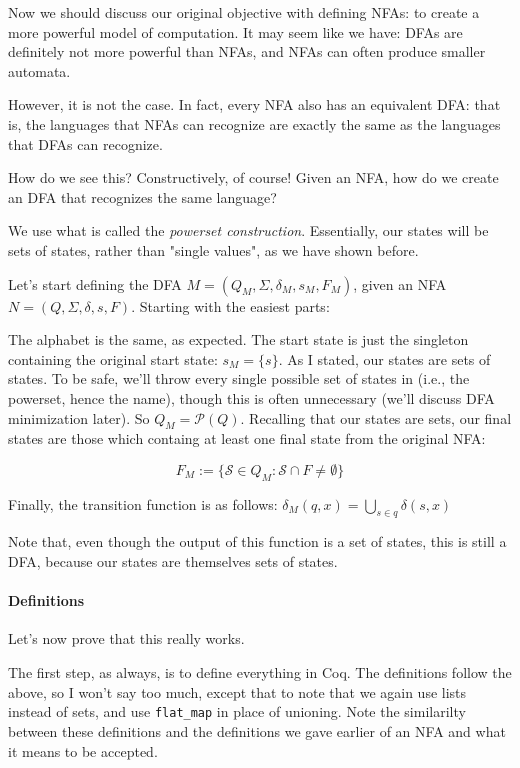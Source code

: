 Now we should discuss our original objective with defining NFAs: to create a more powerful model of computation.
It may seem like we have: DFAs are definitely not more powerful than NFAs, and NFAs can often produce smaller automata.

However, it is not the case.
In fact, every NFA also has an equivalent DFA: that is, the languages that NFAs can recognize are exactly the same as the languages that DFAs can recognize.

How do we see this?
Constructively, of course!
Given an NFA, how do we create an DFA that recognizes the same language?

We use what is called the \textit{powerset construction}.
Essentially, our states will be sets of states, rather than "single values", as we have shown before.

Let's start defining the DFA $M = (Q_M, \Sigma, \delta_M, s_M, F_M)$, given an NFA $N = (Q, \Sigma, \delta, s, F)$.
Starting with the easiest parts:

The alphabet is the same, as expected.
The start state is just the singleton containing the original start state: $s_M = \{s\}$.
As I stated, our states are sets of states.
To be safe, we'll throw every single possible set of states in (i.e., the powerset, hence the name), though this is often unnecessary (we'll discuss DFA minimization later).
So $Q_M = \mathcal{P}(Q)$.
Recalling that our states are sets, our final states are those which containg at least one final state from the original NFA:

$$F_M := \{ \mathcal{S} \in Q_M : \mathcal{S} \cap F \neq \emptyset \}$$

Finally, the transition function is as follows: $\delta_M(q, x) = \displaystyle\bigcup_{s \in q} \delta(s,x) $

Note that, even though the output of this function is a set of states, this is still a DFA, because our states are themselves sets of states.

\paragraph{Definitions}

Let's now prove that this really works.

The first step, as always, is to define everything in Coq.
The definitions follow the above, so I won't say too much, except that to note that we again use lists instead of sets, and use \texttt{flat_map} in place of unioning.
Note the similarilty between these definitions and the definitions we gave earlier of an NFA and what it means to be accepted.

